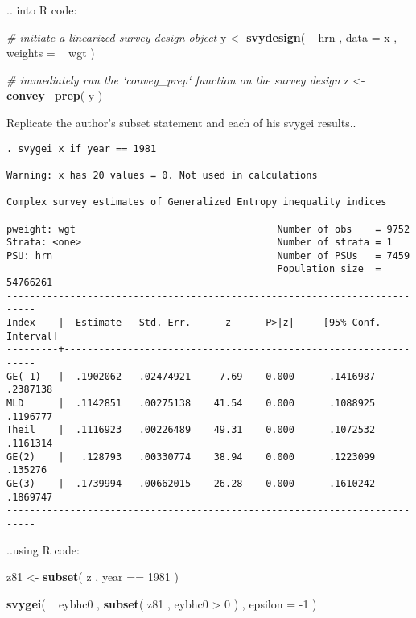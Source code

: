 \documentclass[]{book}
\newenvironment{Shaded}{\begin{snugshade}}{\end{snugshade}}
\newcommand{\KeywordTok}[1]{\textcolor[rgb]{0.13,0.29,0.53}{\textbf{{#1}}}}
\newcommand{\DataTypeTok}[1]{\textcolor[rgb]{0.13,0.29,0.53}{{#1}}}
\newcommand{\DecValTok}[1]{\textcolor[rgb]{0.00,0.00,0.81}{{#1}}}
\newcommand{\StringTok}[1]{\textcolor[rgb]{0.31,0.60,0.02}{{#1}}}
\newcommand{\CommentTok}[1]{\textcolor[rgb]{0.56,0.35,0.01}{\textit{{#1}}}}
\newcommand{\NormalTok}[1]{{#1}}
\begin{document}
.. into R code:

\begin{Shaded}
\begin{Highlighting}[]
\CommentTok{# initiate a linearized survey design object}
\NormalTok{y <-}\StringTok{ }\KeywordTok{svydesign}\NormalTok{( ~}\StringTok{ }\NormalTok{hrn , }\DataTypeTok{data =} \NormalTok{x , }\DataTypeTok{weights =} \NormalTok{~}\StringTok{ }\NormalTok{wgt )}

\CommentTok{# immediately run the `convey_prep` function on the survey design}
\NormalTok{z <-}\StringTok{ }\KeywordTok{convey_prep}\NormalTok{( y )}
\end{Highlighting}
\end{Shaded}

Replicate the author's subset statement and each of his svygei results..

\begin{verbatim}
. svygei x if year == 1981
 
Warning: x has 20 values = 0. Not used in calculations

Complex survey estimates of Generalized Entropy inequality indices
 
pweight: wgt                                   Number of obs    = 9752
Strata: <one>                                  Number of strata = 1
PSU: hrn                                       Number of PSUs   = 7459
                                               Population size  = 54766261
---------------------------------------------------------------------------
Index    |  Estimate   Std. Err.      z      P>|z|     [95% Conf. Interval]
---------+-----------------------------------------------------------------
GE(-1)   |  .1902062   .02474921     7.69    0.000      .1416987   .2387138
MLD      |  .1142851   .00275138    41.54    0.000      .1088925   .1196777
Theil    |  .1116923   .00226489    49.31    0.000      .1072532   .1161314
GE(2)    |   .128793   .00330774    38.94    0.000      .1223099    .135276
GE(3)    |  .1739994   .00662015    26.28    0.000      .1610242   .1869747
---------------------------------------------------------------------------
\end{verbatim}

..using R code:

\begin{Shaded}
\begin{Highlighting}[]
\NormalTok{z81 <-}\StringTok{ }\KeywordTok{subset}\NormalTok{( z , year ==}\StringTok{ }\DecValTok{1981} \NormalTok{)}

\KeywordTok{svygei}\NormalTok{( ~}\StringTok{ }\NormalTok{eybhc0 , }\KeywordTok{subset}\NormalTok{( z81 , eybhc0 >}\StringTok{ }\DecValTok{0} \NormalTok{) , }\DataTypeTok{epsilon =} \NormalTok{-}\DecValTok{1} \NormalTok{)}
\end{Highlighting}
\end{Shaded}
\end{document}
